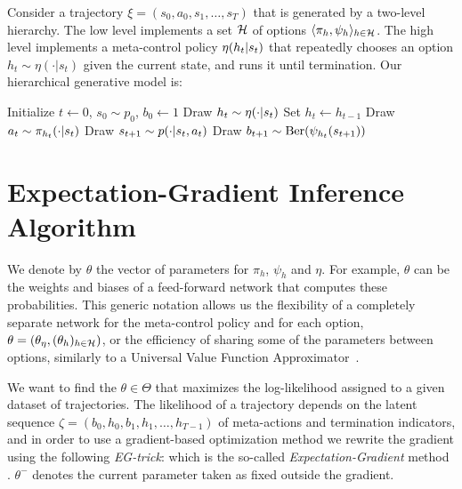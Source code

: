 Consider a trajectory $\xi=(s_0,a_0,s_1,\ldots,s_T)$ that is generated by a two-level hierarchy. The low level implements a set $\mathcal{H}$ of options $\langle \pi_h, \psi_h \rangle_{h\in\mathcal{H}}$. The high level implements a meta-control policy $\eta(h_t \vert s_t)$ that repeatedly chooses an option $h_t\sim\eta(\cdot|s_t)$ given the current state, and runs it until termination. Our hierarchical generative model is:
\begin{algorithmic}
\State Initialize $t\gets0$, $s_0 \sim p_0$, $b_0 \gets 1$
            \State Draw $h_t \sim \eta(\cdot \vert s_t)$
        \Else
            \State Set $h_t \gets h_{t-1}$
        \EndIf
        \State Draw $a_t \sim \pi_{h_t}(\cdot \vert s_t)$
	\State Draw $s_{t+1} \sim p(\cdot \vert s_t, a_t)$
	\State Draw $b_{t+1} \sim \mathrm{Ber}(\psi_{h_t}(s_{t+1}))$
    \EndFor
\end{algorithmic}


\section{Expectation-Gradient Inference Algorithm}
We denote by $\theta$ the vector of parameters for $\pi_h$, $\psi_h$ and $\eta$. For example, $\theta$ can be the weights and biases of a feed-forward network that computes these probabilities. This generic notation allows us the flexibility of a completely separate network for the meta-control policy and for each option, $\theta=(\theta_\eta,(\theta_h)_{h\in\mathcal{H}})$, or the efficiency of sharing some of the parameters between options, similarly to a Universal Value Function Approximator~\cite{schaul2015universal}.

We want to find the $\theta\in\Theta$ that maximizes the log-likelihood assigned to a given dataset of trajectories. The likelihood of a trajectory depends on the latent sequence $\zeta = (b_0,h_0,b_1,h_1,\ldots,h_{T-1})$ of meta-actions and termination indicators, and in order to use a gradient-based optimization method we rewrite the gradient using the following \emph{EG-trick}:
which is the so-called \emph{Expectation-Gradient} method \cite{salakhutdinov2003optimization,mclachlan2007algorithm}. $\theta^-$ denotes the current parameter taken as fixed outside the gradient.


